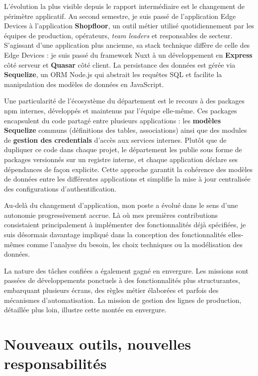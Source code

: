 \documentclass[pe1a]{tnreport} %
\begin{document}
L'évolution la plus visible depuis le rapport intermédiaire est le changement 
de périmètre applicatif. Au second semestre, je suis passé de l'application 
Edge Devices à l'application \textbf{Shopfloor}, un outil métier utilisé 
quotidiennement par les équipes de production, opérateurs, \textit{team 
leaders} et responsables de secteur. S'agissant d'une application plus
ancienne, sa stack technique diffère de celle des Edge Devices :
je suis passé du framework Nuxt à un développement en \textbf{Express} côté
serveur et \textbf{\gls{Quasar}} côté client. La persistance des données est
gérée via \textbf{\gls{Sequelize}}, un ORM Node.js qui abstrait les requêtes
SQL et facilite la manipulation des modèles de données en JavaScript.

Une particularité de l'écosystème du département est le recours à des
packages npm internes, développés et maintenus par l'équipe elle-même.
Ces packages encapsulent du code partagé entre plusieurs applications :
les \textbf{modèles \gls{Sequelize}} communs (définitions des tables, associations)
ainsi que des modules de \textbf{gestion des credentials} d'accès aux services
internes. Plutôt que de dupliquer ce code dans chaque projet, le département
les publie sous forme de packages versionnés sur un registre interne,
et chaque application déclare ses dépendances de façon explicite. Cette
approche garantit la cohérence des modèles de données entre les différentes
applications et simplifie la mise à jour centralisée des configurations
d'authentification.

Au-delà du changement d'application, mon poste a évolué dans le sens d'une 
autonomie progressivement accrue. Là où mes premières contributions 
consistaient principalement à implémenter des fonctionnalités déjà 
spécifiées, je suis désormais davantage impliqué dans la conception
des fonctionnalités elles-mêmes comme l'analyse du besoin, les choix techniques ou
la modélisation des données.

La nature des tâches confiées a également gagné en envergure. Les missions 
sont passées de développements ponctuels à des fonctionnalités plus 
structurantes, embarquant plusieurs écrans, des règles métier élaborées et 
parfois des mécanismes d'automatisation. La mission de gestion des lignes 
de production, détaillée plus loin, illustre cette montée en envergure.

\section{Nouveaux outils, nouvelles responsabilités}
\end{document}
